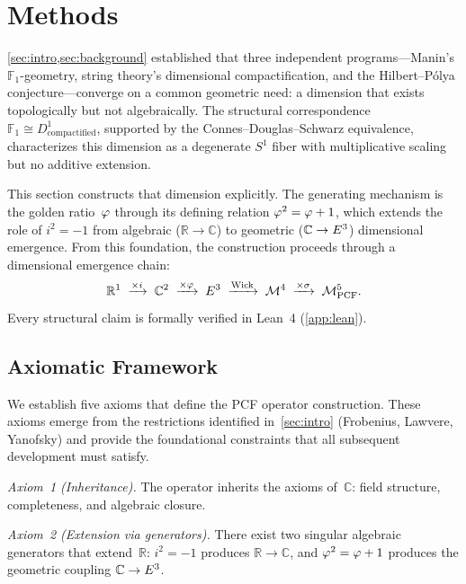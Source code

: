 \section{Methods}\label{sec:methods}

\cref{sec:intro,sec:background} established that three
independent programs---Manin's $\mathbb{F}_1$-geometry, string theory's
dimensional compactification, and the Hilbert--P\'olya conjecture---converge
on a common geometric need: a dimension that exists topologically but not
algebraically.  The structural correspondence
$\mathbb{F}_1\cong D^1_{\text{compactified}}$, supported by the
Connes--Douglas--Schwarz equivalence, characterizes this dimension as a
degenerate $S^1$ fiber with multiplicative scaling but no additive extension.

This section constructs that dimension explicitly.  The generating mechanism
is the golden ratio~$\varphi$ through its defining relation
$\varphi^2 = \varphi + 1$, which extends the role of $i^2=-1$ from
algebraic ($\mathbb{R}\to\mathbb{C}$) to geometric
($\mathbb{C}\to E^3$) dimensional emergence.  From this foundation, the
construction proceeds through a dimensional emergence chain:
\[
  \mathbb{R}^1
    \;\xrightarrow{\times i}\;
  \mathbb{C}^2
    \;\xrightarrow{\times\varphi}\;
  E^3
    \;\xrightarrow{\text{Wick}}\;
  \mathcal{M}^4
    \;\xrightarrow{\times\sigma}\;
  \mathcal{M}^5_{\mathrm{PCF}}.
\]
Every structural claim is formally verified in Lean~4 (\cref{app:lean}).

\subsection{Axiomatic Framework}\label{ssec:axioms}

We establish five axioms that define the PCF operator construction.
These axioms emerge from the restrictions identified in~\cref{sec:intro}
(Frobenius, Lawvere, Yanofsky) and provide the foundational constraints that
all subsequent development must satisfy.

\emph{Axiom~1 (Inheritance).}  The operator inherits the axioms
of~$\mathbb{C}$: field structure, completeness, and algebraic closure.

\emph{Axiom~2 (Extension via generators).}  There exist two singular
algebraic generators that extend~$\mathbb{R}$: $i^2=-1$ produces
$\mathbb{R}\to\mathbb{C}$, and $\varphi^2=\varphi+1$ produces the
geometric coupling $\mathbb{C}\to E^3$.

